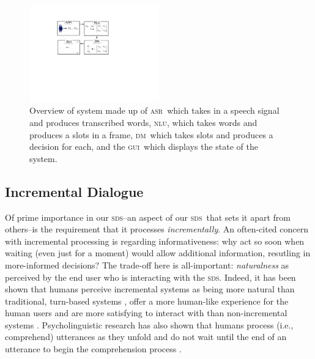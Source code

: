 \documentclass[11pt]{article}
\newcommand{\sds}[0]{\textsc{sds}}
\newcommand{\nlu}[0]{\textsc{nlu}}
\newcommand{\asr}[0]{\textsc{asr}}
\newcommand{\dm}[0]{\textsc{dm}}
\newcommand{\ui}[0]{\textsc{gui}}
\begin{document}
\begin{figure}[ht]
  \centering
      \includegraphics[width=0.5\textwidth]{figures/sig16-overview.pdf}	
      \caption{Overview of system made up of \asr\ which takes in a speech signal and produces transcribed words, \nlu, which takes words and produces a slots in a frame, \dm\ which takes slots and produces a decision for each, and the \ui\ which displays the state of the system. \label{fig:overview}}
\end{figure}


\subsection{Incremental Dialogue}

Of prime importance in our \sds--an aspect of our \sds\ that sets it apart from others--is the requirement that it processes \emph{incrementally}. An often-cited concern with incremental processing is regarding informativeness: why act so soon when waiting (even just for a moment) would allow additional information, resutling in more-informed decisions? The trade-off here is all-important: \emph{naturalness} as perceived by the end user who is interacting with the \sds. Indeed, it has been shown that humans perceive incremental systems as being more natural than traditional, turn-based systems \cite{Aist2006,Skantze2009,skantze2010sigdial,Asri2014}, offer a more human-like experience for the human users \cite{Edlund2008b} and are more satisfying to interact with than non-incremental systems \cite{Aistetal:incrunder-short}. Psycholinguistic research has also shown that humans process (i.e., comprehend) utterances as they unfold and do not wait until the end of an utterance to begin the comprehension process \cite{Tanenhaus1995,Spivey_2002tw}. 
\end{document}
